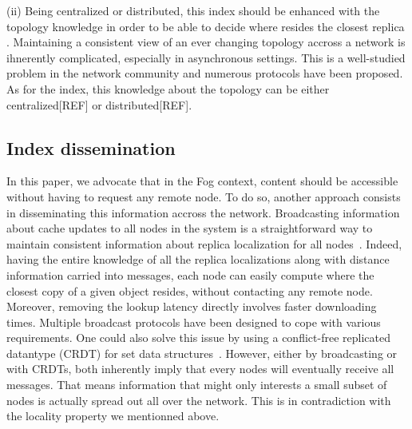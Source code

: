 (ii) Being centralized or distributed, this index should be enhanced with the topology knowledge in order to be able to decide where resides the closest replica . Maintaining a consistent view of an ever changing topology accross a network is ihnerently complicated, especially in asynchronous settings. This is a well-studied problem in the network community and numerous protocols have been proposed. As for the index, this knowledge about the topology can be either centralized[REF] or distributed[REF].



\subsection*{Index dissemination}
In this paper, we advocate that in the Fog context, content should be accessible without having to request any remote node. 
To do so, another approach consists in disseminating this information accross the network.
Broadcasting information about cache updates to all nodes in the system is a straightforward way to maintain consistent information about replica localization for all nodes~\cite{nlsr,lscr}. Indeed, having the entire knowledge of all the replica localizations along with distance information carried into messages, each node can easily compute where the closest copy of a given object resides, without contacting any remote node. Moreover, removing the lookup latency directly involves faster downloading times. 
Multiple broadcast protocols have been designed to cope with various requirements.
One could also solve this issue by using a conflict-free replicated datantype (CRDT) for set data structures~\cite{shapiro2011crdts}. 
However, either by broadcasting or with CRDTs, both inherently imply that every nodes will eventually receive all messages. 
That means information that might only interests a small subset of nodes is actually spread out all over the network. This is in contradiction with the locality property we mentionned above.

